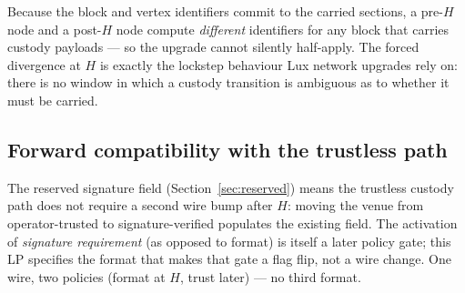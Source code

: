 Because the block and vertex identifiers commit to the carried sections,
a pre-$H$ node and a post-$H$ node compute \emph{different} identifiers
for any block that carries custody payloads --- so the upgrade cannot
silently half-apply. The forced divergence at $H$ is exactly the
lockstep behaviour Lux network upgrades rely on: there is no window in
which a custody transition is ambiguous as to whether it must be
carried.

\subsection{Forward compatibility with the trustless path}

The reserved signature field (Section~\ref{sec:reserved}) means the
trustless custody path does not require a second wire bump after $H$:
moving the venue from operator-trusted to signature-verified populates
the existing field. The activation of \emph{signature requirement} (as
opposed to format) is itself a later policy gate; this LP specifies the
format that makes that gate a flag flip, not a wire change. One wire,
two policies (format at $H$, trust later) --- no third format.
